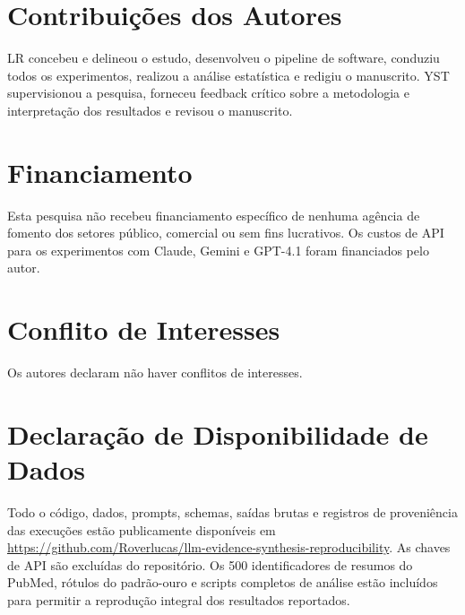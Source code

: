 \documentclass[12pt, a4paper]{article}
\begin{document}
\section*{Contribuições dos Autores}

LR concebeu e delineou o estudo, desenvolveu o pipeline de software, conduziu todos os experimentos, realizou a análise estatística e redigiu o manuscrito.
YST supervisionou a pesquisa, forneceu feedback crítico sobre a metodologia e interpretação dos resultados e revisou o manuscrito.

\section*{Financiamento}

Esta pesquisa não recebeu financiamento específico de nenhuma agência de fomento dos setores público, comercial ou sem fins lucrativos.
Os custos de API para os experimentos com Claude, Gemini e GPT-4.1 foram financiados pelo autor.

\section*{Conflito de Interesses}

Os autores declaram não haver conflitos de interesses.

\section*{Declaração de Disponibilidade de Dados}

Todo o código, dados, prompts, schemas, saídas brutas e registros de proveniência das execuções estão publicamente disponíveis em \url{https://github.com/Roverlucas/llm-evidence-synthesis-reproducibility}.
As chaves de API são excluídas do repositório.
Os 500 identificadores de resumos do PubMed, rótulos do padrão-ouro e scripts completos de análise estão incluídos para permitir a reprodução integral dos resultados reportados.
\end{document}
